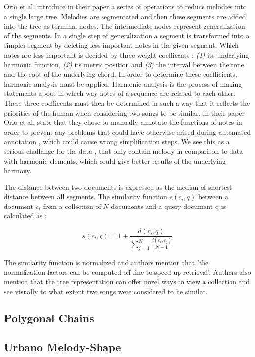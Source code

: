 \documentclass{llncs}
\begin{document}
		Orio et al. \cite{two_point_four} introduce in their paper a series of operations to reduce melodies into a single large tree. Melodies are segmentated and then these segments are added into the tree as terminal nodes. The intermediate nodes represent generalization of the segments. 
		In a single step of generalization a segment is transformed into a simpler segment by deleting less important notes in the given segment. Which notes are less important is decided by three weight coefficents : \textit{(1)} its underlying harmonic function, \textit{(2)} its metric position  and \textit{(3)} the interval between the tone and the root of the underlying chord. 
		In order to determine these coefficients, harmonic analysis must be applied. Harmonic analysis is the process of making statements about in which way notes of a sequence are related to each other. These three coefficents must then be determined in such a way that it reflects the priorities of the human when considering two songs to be similar. 
		In their paper Orio et al. state that they chose to manually annotate the functions of notes in order to prevent any problems that could have otherwise arised during automated annotation , which could cause wrong simplification steps. We see this as a serious challange for the data , that only contain melody in comparison to data with harmonic elements, which could give better results of the underlying harmony. 

		The distance between two documents is expressed as the median of shortest distance between all segments. The similarity function $s(c_i , q)$ between a document $c_i$ from a collection of $N$ documents and a query document q is calculated as :
		
		\begin{equation}
			s(c_i , q)= 1 + \frac{d(c_i , q)}{\sum_{j=1}^{N} \frac{d(c_i,c_j)}{N-1}} 
		\end{equation}

		The similarity function is normalized and authors mention that 'the normalization factors can be computed off-line to speed up retrieval'. Authors also mention that the tree representation can offer novel ways to view a collection and see visually to what extent two songs were considered to be similar.

		\subsection{Polygonal Chains}

		\subsection{Urbano Melody-Shape}
\end{document}
